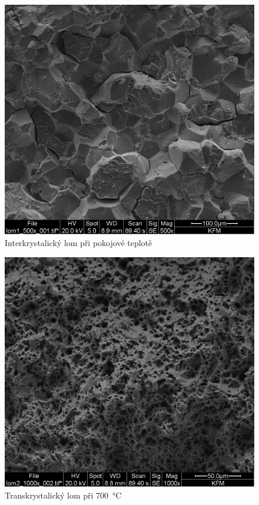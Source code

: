 \begin{figure}[htbp]
\centering
\includegraphics[width=\textwidth-6cm]{graficos/lom1.png}
\caption{Interkrystalický lom při pokojové teplotě}
\label{o:lom1}
\end{figure}

\begin{figure}[htbp]
\centering
\includegraphics[width=\textwidth-6cm]{graficos/lom2.png}
\caption{Transkrystalický lom při \SI{700}{\degreeCelsius}}
\label{o:lom2}
\end{figure}

